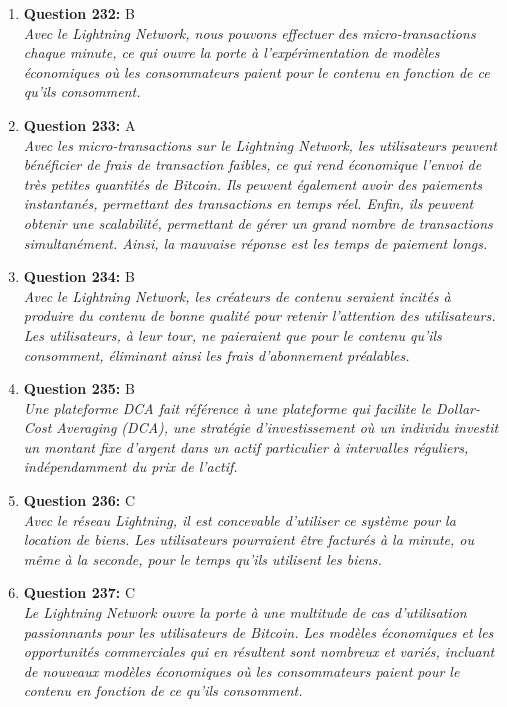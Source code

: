 \documentclass[12pt,a4paper]{article}
\begin{document}
\begin{enumerate}
\item \textbf{Question 232:} B
\\ \textit{Avec le Lightning Network, nous pouvons effectuer des micro-transactions chaque minute, ce qui ouvre la porte à l'expérimentation de modèles économiques où les consommateurs paient pour le contenu en fonction de ce qu'ils consomment.}

\item \textbf{Question 233:} A
\\ \textit{Avec les micro-transactions sur le Lightning Network, les utilisateurs peuvent bénéficier de frais de transaction faibles, ce qui rend économique l'envoi de très petites quantités de Bitcoin. Ils peuvent également avoir des paiements instantanés, permettant des transactions en temps réel. Enfin, ils peuvent obtenir une scalabilité, permettant de gérer un grand nombre de transactions simultanément. Ainsi, la mauvaise réponse est les temps de paiement longs.}

\item \textbf{Question 234:} B
\\ \textit{Avec le Lightning Network, les créateurs de contenu seraient incités à produire du contenu de bonne qualité pour retenir l'attention des utilisateurs. Les utilisateurs, à leur tour, ne paieraient que pour le contenu qu'ils consomment, éliminant ainsi les frais d'abonnement préalables.}

\item \textbf{Question 235:} B
\\ \textit{Une plateforme DCA fait référence à une plateforme qui facilite le Dollar-Cost Averaging (DCA), une stratégie d'investissement où un individu investit un montant fixe d'argent dans un actif particulier à intervalles réguliers, indépendamment du prix de l'actif.}

\item \textbf{Question 236:} C
\\ \textit{Avec le réseau Lightning, il est concevable d'utiliser ce système pour la location de biens. Les utilisateurs pourraient être facturés à la minute, ou même à la seconde, pour le temps qu'ils utilisent les biens.}

\item \textbf{Question 237:} C
\\ \textit{Le Lightning Network ouvre la porte à une multitude de cas d'utilisation passionnants pour les utilisateurs de Bitcoin. Les modèles économiques et les opportunités commerciales qui en résultent sont nombreux et variés, incluant de nouveaux modèles économiques où les consommateurs paient pour le contenu en fonction de ce qu'ils consomment.}


\end{enumerate}
\end{document}
